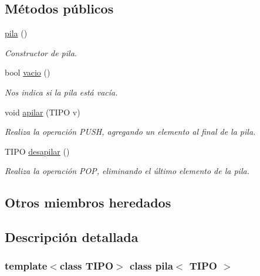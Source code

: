 \subsection*{Métodos públicos}
\begin{DoxyCompactItemize}
\item 
\mbox{\label{classpila_ade9134db35fdc8ab820f087b7bf9a4c8}} 
\hyperlink{classpila_ade9134db35fdc8ab820f087b7bf9a4c8}{pila} ()
\begin{DoxyCompactList}\small\item\em Constructor de pila. \end{DoxyCompactList}\item 
bool \hyperlink{classpila_a1c4a98c4932e4b2f7c174921c2443e8a}{vacio} ()
\begin{DoxyCompactList}\small\item\em Nos indica si la pila está vacía. \end{DoxyCompactList}\item 
void \hyperlink{classpila_aadc65c1c0f7d355204aa80d0ca10b688}{apilar} (T\+I\+PO v)
\begin{DoxyCompactList}\small\item\em Realiza la operación P\+U\+SH, agregando un elemento al final de la pila. \end{DoxyCompactList}\item 
\mbox{\label{classpila_a6024dd235a660c7806e47a36194b97cc}} 
T\+I\+PO \hyperlink{classpila_a6024dd235a660c7806e47a36194b97cc}{desapilar} ()
\begin{DoxyCompactList}\small\item\em Realiza la operación P\+OP, eliminando el último elemento de la pila. \end{DoxyCompactList}\end{DoxyCompactItemize}
\subsection*{Otros miembros heredados}


\subsection{Descripción detallada}
\subsubsection*{template$<$class T\+I\+PO$>$\newline
class pila$<$ T\+I\+P\+O $>$}


